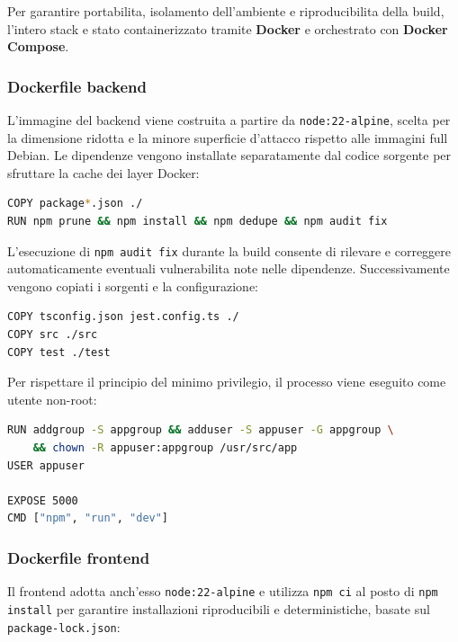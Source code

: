 \documentclass[a4paper,11pt]{article}
\begin{document}
Per garantire portabilita, isolamento dell'ambiente e riproducibilita della build, l'intero stack e stato containerizzato tramite \textbf{Docker} e orchestrato con \textbf{Docker Compose}.

\subsubsection{Dockerfile backend}

L'immagine del backend viene costruita a partire da \texttt{node:22-alpine}, scelta per la dimensione ridotta e la minore superficie d'attacco rispetto alle immagini full Debian. Le dipendenze vengono installate separatamente dal codice sorgente per sfruttare la cache dei layer Docker:

\begin{lstlisting}[style=projectcode, language=bash]
COPY package*.json ./
RUN npm prune && npm install && npm dedupe && npm audit fix
\end{lstlisting}

L'esecuzione di \texttt{npm audit fix} durante la build consente di rilevare e correggere automaticamente eventuali vulnerabilita note nelle dipendenze. Successivamente vengono copiati i sorgenti e la configurazione:

\begin{lstlisting}[style=projectcode, language=bash]
COPY tsconfig.json jest.config.ts ./
COPY src ./src
COPY test ./test
\end{lstlisting}

Per rispettare il principio del minimo privilegio, il processo viene eseguito come utente non-root:

\begin{lstlisting}[style=projectcode, language=bash]
RUN addgroup -S appgroup && adduser -S appuser -G appgroup \
    && chown -R appuser:appgroup /usr/src/app
USER appuser

EXPOSE 5000
CMD ["npm", "run", "dev"]
\end{lstlisting}

\subsubsection{Dockerfile frontend}

Il frontend adotta anch'esso \texttt{node:22-alpine} e utilizza \texttt{npm ci} al posto di \texttt{npm install} per garantire installazioni riproducibili e deterministiche, basate sul \texttt{package-lock.json}:
\end{document}
